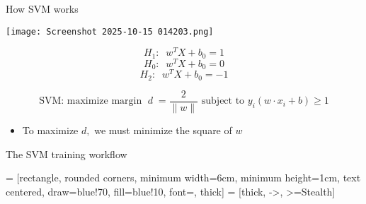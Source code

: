 \documentclass{beamer}
\begin{document}
\begin{frame}{How SVM works}
\begin{center}
\begin{minipage}{0.5\textwidth} %
    \centering
    \texttt{[image: Screenshot 2025-10-15 014203.png]}
\end{minipage}%
\hfill
\begin{minipage}{0.3\textwidth} %
    \small %
    \[
    H_1: \; \; w^TX + b_0 = 1
    \]
    \[
    H_0: \; \; w^TX + b_0 =  0
    \]
    \[
    H_2: \; \;w^TX + b_0 = -1
    \]
\end{minipage}
\end{center}

\[
\text{SVM: } \text{maximize margin } \; d\; = \frac{2}{\|w\|} \text{ subject to } y_i(w \cdot x_i + b) \ge 1
\]

\begin{itemize}
\vspace{0.1cm}
\item To maximize $d,$ we must minimize the square of $w$
\end{itemize}


\end{frame}


\begin{frame}{The SVM training workflow}



\centering
{} = [rectangle, rounded corners, minimum width=6cm, 
                   minimum height=1cm, text centered, draw=blue!70, 
                   fill=blue!10, font=\small, thick]
 = [thick, ->, >=Stealth]







\end{frame}
\end{document}
